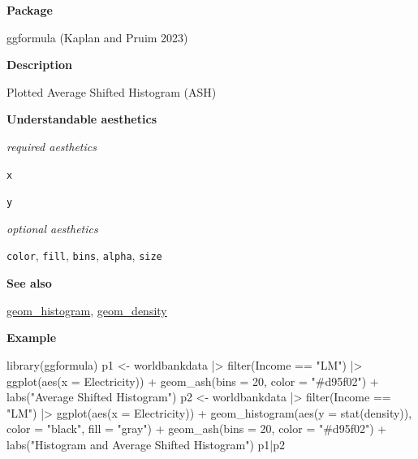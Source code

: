 \documentclass[
  letterpaper,
  DIV=11,
  numbers=noendperiod]{scrreprt}
\newenvironment{Shaded}{\begin{snugshade}}{\end{snugshade}}
\newcommand{\AttributeTok}[1]{\textcolor[rgb]{0.40,0.45,0.13}{#1}}
\newcommand{\DecValTok}[1]{\textcolor[rgb]{0.68,0.00,0.00}{#1}}
\newcommand{\FunctionTok}[1]{\textcolor[rgb]{0.28,0.35,0.67}{#1}}
\newcommand{\NormalTok}[1]{\textcolor[rgb]{0.00,0.23,0.31}{#1}}
\newcommand{\OtherTok}[1]{\textcolor[rgb]{0.00,0.23,0.31}{#1}}
\newcommand{\SpecialCharTok}[1]{\textcolor[rgb]{0.37,0.37,0.37}{#1}}
\newcommand{\StringTok}[1]{\textcolor[rgb]{0.13,0.47,0.30}{#1}}
\begin{document}
\textbf{Package}

ggformula (Kaplan and Pruim 2023)

\textbf{Description}

Plotted Average Shifted Histogram (ASH)

\textbf{Understandable aesthetics}

\emph{required aesthetics}

\texttt{x}

\texttt{y}

\emph{optional aesthetics}

\texttt{color}, \texttt{fill}, \texttt{bins}, \texttt{alpha},
\texttt{size}

\textbf{See also}

\hyperref[histogram]{geom\_histogram}, \hyperref[density]{geom\_density}

\textbf{Example}

\begin{Shaded}
\begin{Highlighting}[]
\FunctionTok{library}\NormalTok{(ggformula)}
\NormalTok{p1 }\OtherTok{\textless{}{-}}\NormalTok{ worldbankdata }\SpecialCharTok{|\textgreater{}}
  \FunctionTok{filter}\NormalTok{(Income }\SpecialCharTok{==} \StringTok{"LM"}\NormalTok{) }\SpecialCharTok{|\textgreater{}}
  \FunctionTok{ggplot}\NormalTok{(}\FunctionTok{aes}\NormalTok{(}\AttributeTok{x =}\NormalTok{ Electricity)) }\SpecialCharTok{+}
   \FunctionTok{geom\_ash}\NormalTok{(}\AttributeTok{bins =} \DecValTok{20}\NormalTok{, }\AttributeTok{color =} \StringTok{"\#d95f02"}\NormalTok{) }\SpecialCharTok{+} \FunctionTok{labs}\NormalTok{(}\StringTok{"Average Shifted Histogram"}\NormalTok{)}
\NormalTok{p2 }\OtherTok{\textless{}{-}}\NormalTok{ worldbankdata }\SpecialCharTok{|\textgreater{}}
  \FunctionTok{filter}\NormalTok{(Income }\SpecialCharTok{==} \StringTok{"LM"}\NormalTok{) }\SpecialCharTok{|\textgreater{}}
  \FunctionTok{ggplot}\NormalTok{(}\FunctionTok{aes}\NormalTok{(}\AttributeTok{x =}\NormalTok{ Electricity)) }\SpecialCharTok{+}
  \FunctionTok{geom\_histogram}\NormalTok{(}\FunctionTok{aes}\NormalTok{(}\AttributeTok{y =} \FunctionTok{stat}\NormalTok{(density)), }\AttributeTok{color =} \StringTok{"black"}\NormalTok{, }\AttributeTok{fill =} \StringTok{"gray"}\NormalTok{) }\SpecialCharTok{+}
   \FunctionTok{geom\_ash}\NormalTok{(}\AttributeTok{bins =} \DecValTok{20}\NormalTok{, }\AttributeTok{color =} \StringTok{"\#d95f02"}\NormalTok{) }\SpecialCharTok{+} \FunctionTok{labs}\NormalTok{(}\StringTok{"Histogram and Average Shifted Histogram"}\NormalTok{)}
\NormalTok{p1}\SpecialCharTok{|}\NormalTok{p2}
\end{Highlighting}
\end{Shaded}
\end{document}
